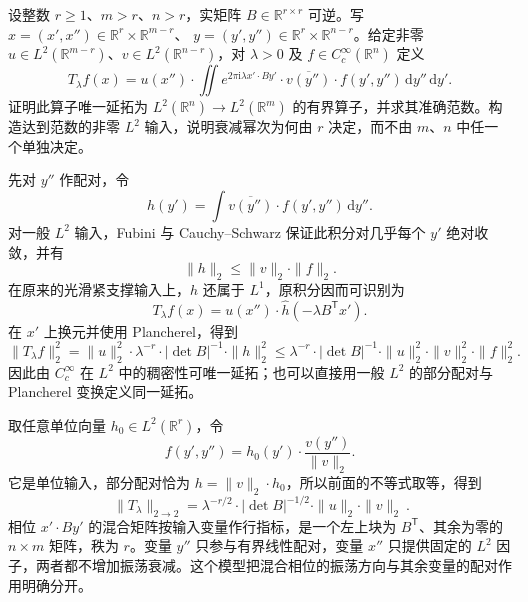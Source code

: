 \begin{exercise}\label{b2:ex:21-new-6}
设整数 \(r\geq1\)、\(m>r\)、\(n>r\)，实矩阵 \(B\in\mathbb R^{r\times r}\) 可逆。写
\(x=(x',x'')\in\mathbb R^r\times\mathbb R^{m-r}\)、
\(y=(y',y'')\in\mathbb R^r\times\mathbb R^{n-r}\)。给定非零
\(u\in L^2(\mathbb R^{m-r})\)、\(v\in L^2(\mathbb R^{n-r})\)，对 \(\lambda>0\) 及 \(f\in C_c^\infty(\mathbb R^n)\) 定义
\[
 T_\lambda f(x)
 =u(x'')\cdot\iint
       e^{2\pi\mathrm i\lambda x'\cdot By'}
       \cdot\overline{v(y'')}\cdot f(y',y'')\,\mathrm dy''\,\mathrm dy'.
\]
证明此算子唯一延拓为 \(L^2(\mathbb R^n)\to L^2(\mathbb R^m)\) 的有界算子，并求其准确范数。构造达到范数的非零 \(L^2\) 输入，说明衰减幂次为何由 \(r\) 决定，而不由 \(m\)、\(n\) 中任一个单独决定。
\end{exercise}
\begin{solution}
先对 \(y''\) 作配对，令
\[
 h(y')=\int\overline{v(y'')}\cdot f(y',y'')\,\mathrm dy''.
\]
对一般 \(L^2\) 输入，Fubini 与 Cauchy--Schwarz 保证此积分对几乎每个 \(y'\) 绝对收敛，并有
\[
 \|h\|_2\leq\|v\|_2\cdot\|f\|_2.
\]
在原来的光滑紧支撑输入上，\(h\) 还属于 \(L^1\)，原积分因而可识别为
\[
 T_\lambda f(x)=u(x'')\cdot\widehat h(-\lambda B^{\mathsf T}x').
\]
在 \(x'\) 上换元并使用 Plancherel，得到
\[
 \|T_\lambda f\|_2^2
 =\|u\|_2^2\cdot\lambda^{-r}\cdot|\det B|^{-1}\cdot\|h\|_2^2
 \leq\lambda^{-r}\cdot|\det B|^{-1}
             \cdot\|u\|_2^2\cdot\|v\|_2^2\cdot\|f\|_2^2.
\]
因此由 \(C_c^\infty\) 在 \(L^2\) 中的稠密性可唯一延拓；也可以直接用一般 \(L^2\) 的部分配对与 Plancherel 变换定义同一延拓。

取任意单位向量 \(h_0\in L^2(\mathbb R^r)\)，令
\[
 f(y',y'')=h_0(y')\cdot\frac{v(y'')}{\|v\|_2}.
\]
它是单位输入，部分配对恰为 \(h=\|v\|_2\cdot h_0\)，所以前面的不等式取等，得到
\[
 \boxed{\ \|T_\lambda\|_{2\to2}
 =\lambda^{-r/2}\cdot|\det B|^{-1/2}
                   \cdot\|u\|_2\cdot\|v\|_2\ }.
\]
相位 \(x'\cdot By'\) 的混合矩阵按输入变量作行指标，是一个左上块为 \(B^{\mathsf T}\)、其余为零的 \(n\times m\) 矩阵，秩为 \(r\)。变量 \(y''\) 只参与有界线性配对，变量 \(x''\) 只提供固定的 \(L^2\) 因子，两者都不增加振荡衰减。这个模型把混合相位的振荡方向与其余变量的配对作用明确分开。
\end{solution}

